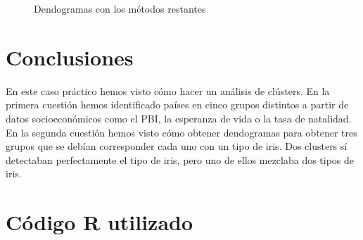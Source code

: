 \documentclass[12pt,a4paper,twoside,openright,titlepage,final]{article}
\begin{document}
\begin{figure}[htbp]
\caption{Dendogramas con los métodos restantes} \label{fig:dendogramas_otros_metodos}
\end{figure}

\section{Conclusiones}

En este caso práctico hemos visto cómo hacer un análisis de clústers. En la primera cuestión hemos identificado países en cinco grupos distintos a partir de datos socioeconómicos como el PBI, la esperanza de vida o la tasa de natalidad. En la segunda cuestión hemos visto cómo obtener dendogramas para obtener tres grupos que se debían corresponder cada uno con un tipo de iris. Dos clusters sí detectaban perfectamente el tipo de iris, pero uno de ellos mezclaba dos tipos de iris.

\clearpage

\section{Código R utilizado}


\end{document}
